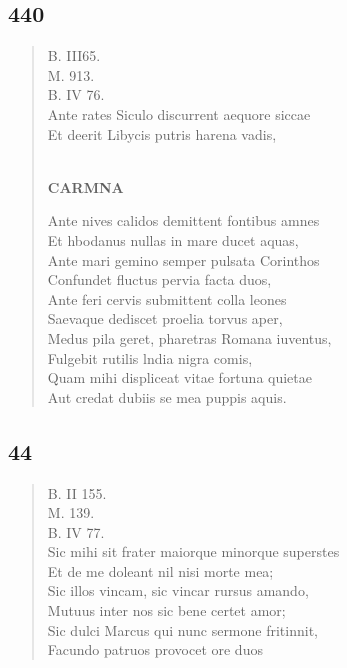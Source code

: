 \documentclass[11pt, a4paper]{report}
\begin{document}
            \subsection*{440}
      \begin{verse}
      B. III65. \\ M. 913. \\ B. IV 76. \\ Ante rates Siculo discurrent aequore siccae \\ Et deerit Libycis putris harena vadis, \\ 
        ﻿\pagebreak 
     \marginpar{[332]} \begin{center} \textbf{CARMNA} \end{center}Ante nives calidos demittent fontibus amnes \\ Et hbodanus nullas in mare ducet aquas, \\ Ante mari gemino semper pulsata Corinthos \\ Confundet fluctus pervia facta duos, \\ Ante feri cervis submittent colla leones \\ Saevaque dediscet proelia torvus aper, \\ Medus pila geret, pharetras Romana iuventus, \\ Fulgebit rutilis lndia nigra comis, \\ Quam mihi displiceat vitae fortuna quietae \\ Aut credat dubiis se mea puppis aquis. \\ 
      \end{verse}
  
            \subsection*{44}
      \begin{verse}
      B. II 155. \\ M. 139. \\ B. IV 77. \\ Sic mihi sit frater maiorque minorque superstes \\ Et de me doleant nil nisi morte mea; \\ Sic illos vincam, sic vincar rursus amando, \\ Mutuus inter nos sic bene certet amor; \\ Sic dulci Marcus qui nunc sermone fritinnit, \\ Facundo patruos provocet ore duos \\ 
      \end{verse}
  
\end{document}
